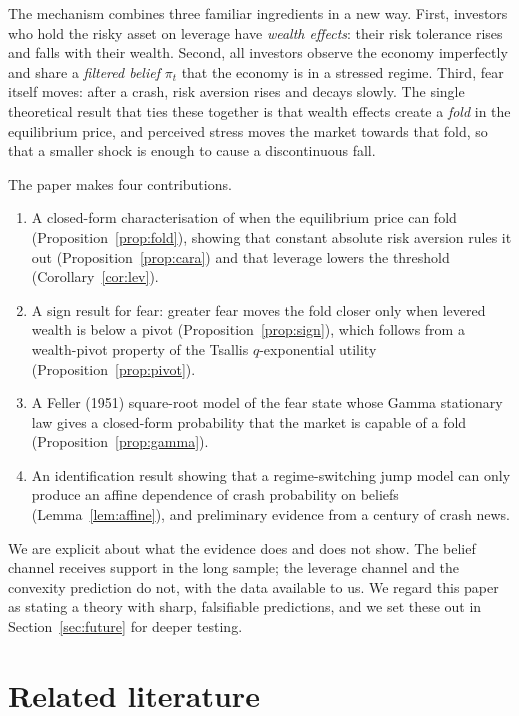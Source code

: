 \documentclass[11pt,a4paper]{article}
\theoremstyle{remark}
\begin{document}
The mechanism combines three familiar ingredients in a new way. First, investors who hold
the risky asset on leverage have \emph{wealth effects}: their risk tolerance rises and falls
with their wealth. Second, all investors observe the economy imperfectly and share a
\emph{filtered belief} $\pi_t$ that the economy is in a stressed regime. Third, fear itself
moves: after a crash, risk aversion rises and decays slowly. The single theoretical result
that ties these together is that wealth effects create a \emph{fold} in the equilibrium
price, and perceived stress moves the market towards that fold, so that a smaller shock is
enough to cause a discontinuous fall.

The paper makes four contributions.
\begin{enumerate}[leftmargin=*]
\item A closed-form characterisation of when the equilibrium price can fold
(Proposition~\ref{prop:fold}), showing that constant absolute risk aversion rules it out
(Proposition~\ref{prop:cara}) and that leverage lowers the threshold (Corollary~\ref{cor:lev}).
\item A sign result for fear: greater fear moves the fold closer only when levered wealth is
below a pivot (Proposition~\ref{prop:sign}), which follows from a wealth-pivot property of
the Tsallis $q$-exponential utility (Proposition~\ref{prop:pivot}).
\item A Feller (1951) square-root model of the fear state whose Gamma stationary law gives a
closed-form probability that the market is capable of a fold
(Proposition~\ref{prop:gamma}).
\item An identification result showing that a regime-switching jump model can only produce
an affine dependence of crash probability on beliefs (Lemma~\ref{lem:affine}), and
preliminary evidence from a century of crash news.
\end{enumerate}

We are explicit about what the evidence does and does not show. The belief channel receives
support in the long sample; the leverage channel and the convexity prediction do not, with
the data available to us. We regard this paper as stating a theory with sharp, falsifiable
predictions, and we set these out in Section~\ref{sec:future} for deeper testing.

\section{Related literature}
\end{document}
